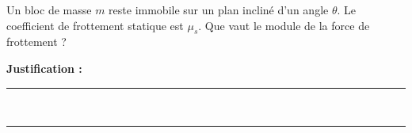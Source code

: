 Un bloc de masse $m$ reste immobile sur un plan incliné d'un angle $\theta$. Le coefficient de frottement statique est $\mu_s$. Que vaut le module de la force de frottement ?

\choices

\noindent\textbf{Justification :} \hrulefill \\[2.5ex]
\rule{\linewidth}{0.4pt} \\[2.5ex]
\rule{\linewidth}{0.4pt}
\vfill
